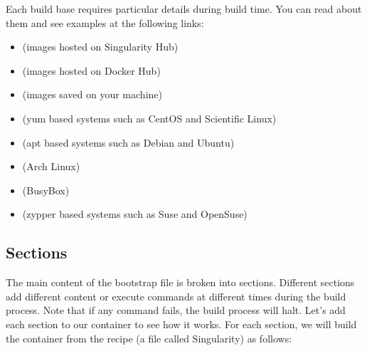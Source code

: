 \documentclass[letterpaper,10pt,english]{sphinxmanual}
\begin{document}
Each build base requires particular details during build time. You can
read about them and see examples at the following links:
\begin{itemize}
\item {} 
{\hyperref[\detokenize{appendix:build-shub}]{}} (images hosted on Singularity Hub)

\item {} 
{\hyperref[\detokenize{appendix:build-docker-module}]{}} (images hosted on Docker Hub)

\item {} 
{\hyperref[\detokenize{appendix:build-localimage}]{}} (images saved on your machine)

\item {} 
{\hyperref[\detokenize{appendix:build-yum}]{}} (yum based systems such as CentOS and Scientific Linux)

\item {} 
{\hyperref[\detokenize{appendix:build-debootstrap}]{}} (apt based systems such as Debian and Ubuntu)

\item {} 
{\hyperref[\detokenize{appendix:build-arch}]{}} (Arch Linux)

\item {} 
{\hyperref[\detokenize{appendix:build-busybox}]{}} (BusyBox)

\item {} 
{\hyperref[\detokenize{appendix:build-zypper}]{}} (zypper based systems such as Suse and OpenSuse)

\end{itemize}


\subsection{Sections}
\label{\detokenize{container_recipes:sections}}
The main content of the bootstrap file is broken into sections.
Different sections add different content or execute commands at
different times during the build process. Note that if any command
fails, the build process will halt.
Let’s add each section to our container to see how it works. For each
section, we will build the container from the recipe (a file called
Singularity) as follows:
\end{document}
